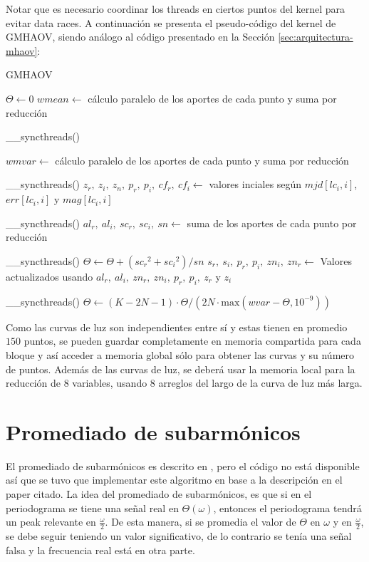 Notar que es necesario coordinar los threads en ciertos puntos del kernel para evitar data races. A continuación se presenta el pseudo-código del kernel de GMHAOV, siendo análogo al código presentado en la Sección \ref{sec:arquitectura-mhaov}:

\begin{algorithm}[H]
\caption{GMHAOV}\label{alg:gmhaov}
\begin{algorithmic}[1]
        \State $\Theta \gets 0$
    \EndIf
    \State $wmean \gets$ cálculo paralelo de los aportes de cada punto y suma por reducción 

    \State \_\_syncthreads()

    \State $wmvar \gets$ cálculo paralelo de los aportes de cada punto y suma por reducción 

    \State \_\_syncthreads()
    \State $z_r, \ z_i, \ z_n, \ p_r, \ p_i, \ cf_r, \ cf_i \gets$ valores inciales según $mjd[lc_i, i]$, $err[lc_i, i]$ y $mag[lc_i, i]$

    \State \_\_syncthreads()
        \State $al_r, \ al_i, \ sc_r, \ sc_i, \ sn \gets$ suma de los aportes de cada punto por reducción

    \State \_\_syncthreads()
            \State $\Theta \gets \Theta + ({sc_r}^{2} + {sc_i}^{2})/sn$
        \EndIf
        \State $s_r, \ s_i, \ p_r, \ p_i, \ zn_i, \ zn_r \gets$ Valores actualizados usando $al_r, \ al_i, \ zn_r, \ zn_i, \ p_r, \ p_i, \ z_r$ y  $z_i$

    \State \_\_syncthreads()
    \EndFor
\State  $\Theta \gets (K-2N-1)\cdot \Theta / (2N\cdot \text{max}(wvar - \Theta, 10^{-9}))$
    \EndFunction
\end{algorithmic}
\end{algorithm}

Como las curvas de luz son independientes entre sí y estas tienen en promedio $150$ puntos, se pueden guardar completamente en memoria compartida para cada bloque y así acceder a memoria global sólo para obtener las curvas y su número de puntos. Además de las curvas de luz, se deberá usar la memoria local para la reducción de 8 variables, usando 8 arreglos del largo de la curva de luz más larga. 

\section{Promediado de subarmónicos}\label{sec:subarmonicos-diseno}
El promediado de subarmónicos es descrito en \cite{graham-entropy}, pero el código no está disponible así que se tuvo que implementar este algoritmo en base a la descripción en el paper citado. La idea del promediado de subarmónicos, es que si en el periodograma se tiene una señal real en $\Theta(\omega)$, entonces el periodograma tendrá un peak relevante en $\frac{\omega}{2}$. De esta manera, si se promedia el valor de $\Theta$ en $\omega$ y en $\frac{\omega}{2}$, se debe seguir teniendo un valor significativo, de lo contrario se tenía una señal falsa y la frecuencia real está en otra parte.

